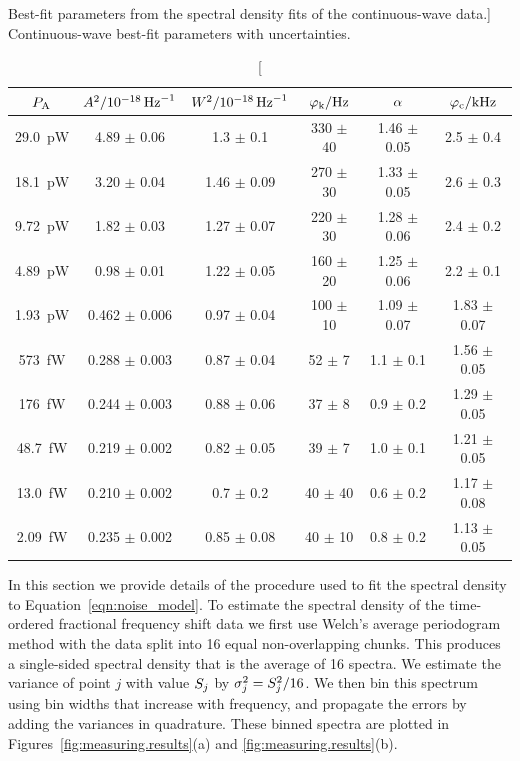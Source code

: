 \begin{table}[t]
\centering
\caption
[Best-fit parameters from the spectral density fits of the continuous-wave data.]
{Continuous-wave best-fit parameters with uncertainties.}
\renewcommand{\arraystretch}{1.2}
\begin{tabular}{cccccc}
\toprule
$\power_\absorbed$ & $\amplifierwhite^2 / \SI{e-18}{Hz^{-1}}$ & $\detectorwhite^2 / \SI{e-18}{Hz^{-1}}$ & $\faudio_\knee / \si{Hz}$ & $\spectralindex$ & $\faudio_\cutoff / \si{kHz}$ \\
\midrule
\SI{29.0}{pW} & 4.89 $\pm$ 0.06 & 1.3 $\pm$ 0.1 & 330 $\pm$ 40 & 1.46 $\pm$ 0.05 & 2.5 $\pm$ 0.4 \\
\SI{18.1}{pW} & 3.20 $\pm$ 0.04 & 1.46 $\pm$ 0.09 & 270 $\pm$ 30 & 1.33 $\pm$ 0.05 & 2.6 $\pm$ 0.3 \\
\SI{9.72}{pW} & 1.82 $\pm$ 0.03 & 1.27 $\pm$ 0.07 & 220 $\pm$ 30 & 1.28 $\pm$ 0.06 & 2.4 $\pm$ 0.2 \\
\SI{4.89}{pW} & 0.98 $\pm$ 0.01 & 1.22 $\pm$ 0.05 & 160 $\pm$ 20 & 1.25 $\pm$ 0.06 & 2.2 $\pm$ 0.1 \\
\SI{1.93}{pW} & 0.462 $\pm$ 0.006 & 0.97 $\pm$ 0.04 & 100 $\pm$ 10 & 1.09 $\pm$ 0.07 & 1.83 $\pm$ 0.07 \\
\SI{573}{fW} & 0.288 $\pm$ 0.003 & 0.87 $\pm$ 0.04 & 52 $\pm$ 7 & 1.1 $\pm$ 0.1 & 1.56 $\pm$ 0.05 \\
\SI{176}{fW} & 0.244 $\pm$ 0.003 & 0.88 $\pm$ 0.06 & 37 $\pm$ 8 & 0.9 $\pm$ 0.2 & 1.29 $\pm$ 0.05 \\
\SI{48.7}{fW} & 0.219 $\pm$ 0.002 & 0.82 $\pm$ 0.05 & 39 $\pm$ 7 & 1.0 $\pm$ 0.1 & 1.21 $\pm$ 0.05 \\
\SI{13.0}{fW} & 0.210 $\pm$ 0.002 & 0.7 $\pm$ 0.2 & 40 $\pm$ 40 & 0.6 $\pm$ 0.2 & 1.17 $\pm$ 0.08 \\
\SI{2.09}{fW} & 0.235 $\pm$ 0.002 & 0.85 $\pm$ 0.08 & 40 $\pm$ 10 & 0.8 $\pm$ 0.2 & 1.13 $\pm$ 0.05 \\
\bottomrule
\end{tabular}
\label{tab:cwfitparams}
\end{table}

In this section we provide details of the procedure used to fit the spectral density to Equation~\ref{eqn:noise_model}.
To estimate the spectral density of the time-ordered fractional frequency shift data we first use Welch's average periodogram method with the data split into 16 equal non-overlapping chunks.
This produces a single-sided spectral density that is the average of 16 spectra.
We estimate the variance of point $j$ with value $\spectraldensity_j$ by $\sigma_j^2 = \spectraldensity_j^2 / 16$.
We then bin this spectrum using bin widths that increase with frequency, and propagate the errors by adding the variances in quadrature.
These binned spectra are plotted in Figures~\ref{fig:measuring.results}(a) and \ref{fig:measuring.results}(b).

